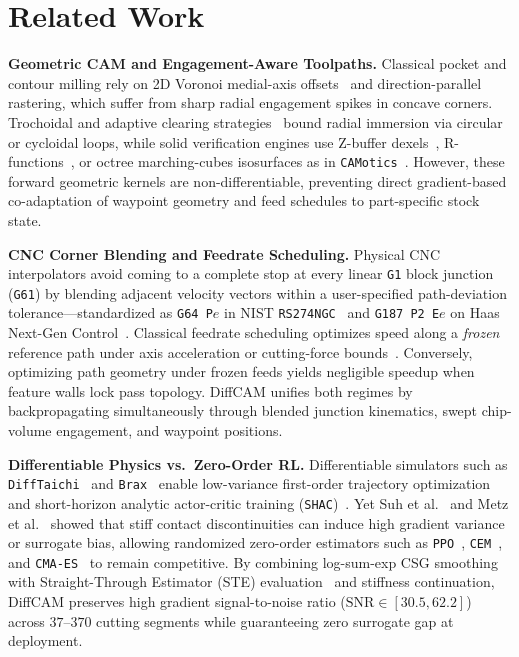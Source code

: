 \documentclass[conference]{IEEEtran}
\begin{document}
\section{Related Work}
\label{sec:related}

\textbf{Geometric CAM and Engagement-Aware Toolpaths.}
Classical pocket and contour milling rely on 2D Voronoi medial-axis offsets~\cite{held1991pocket} and direction-parallel rastering, which suffer from sharp radial engagement spikes in concave corners. Trochoidal and adaptive clearing strategies~\cite{rauch2009trochoidal,altintas2012manufacturing} bound radial immersion via circular or cycloidal loops, while solid verification engines use Z-buffer dexels~\cite{vanhook1986dexel}, R-functions~\cite{shapiro2007rfunctions}, or octree marching-cubes isosurfaces as in \texttt{CAMotics}~\cite{coffland2021camotics}. However, these forward geometric kernels are non-differentiable, preventing direct gradient-based co-adaptation of waypoint geometry and feed schedules to part-specific stock state.

\textbf{CNC Corner Blending and Feedrate Scheduling.}
Physical CNC interpolators avoid coming to a complete stop at every linear \texttt{G1} block junction (\texttt{G61}) by blending adjacent velocity vectors within a user-specified path-deviation tolerance—standardized as \texttt{G64 P}$e$ in NIST \texttt{RS274NGC}~\cite{kramer2000rs274ngc} and \texttt{G187 P2 E}$e$ on Haas Next-Gen Control~\cite{suh2008cnc,erkorkmaz2001highspeed}. Classical feedrate scheduling optimizes speed along a \emph{frozen} reference path under axis acceleration or cutting-force bounds~\cite{altintas2012manufacturing,erkorkmaz2001highspeed}. Conversely, optimizing path geometry under frozen feeds yields negligible speedup when feature walls lock pass topology. DiffCAM unifies both regimes by backpropagating simultaneously through blended junction kinematics, swept chip-volume engagement, and waypoint positions.

\textbf{Differentiable Physics vs.\ Zero-Order RL.}
Differentiable simulators such as \texttt{DiffTaichi}~\cite{hu2020difftaichi} and \texttt{Brax}~\cite{freeman2021brax} enable low-variance first-order trajectory optimization and short-horizon analytic actor-critic training (\texttt{SHAC})~\cite{xu2022accelerated}. Yet Suh et al.~\cite{suh2022differentiable} and Metz et al.~\cite{metz2021gradients} showed that stiff contact discontinuities can induce high gradient variance or surrogate bias, allowing randomized zero-order estimators such as \texttt{PPO}~\cite{schulman2017proximal,schulman2016gae}, \texttt{CEM}~\cite{rubinstein2004cem}, and \texttt{CMA-ES}~\cite{hansen2001cmaes} to remain competitive. By combining log-sum-exp CSG smoothing with Straight-Through Estimator (STE) evaluation~\cite{bengio2013estimating} and stiffness continuation, DiffCAM preserves high gradient signal-to-noise ratio ($\text{SNR} \in [30.5, 62.2]$) across $37$--$370$ cutting segments while guaranteeing zero surrogate gap at deployment.
\end{document}
